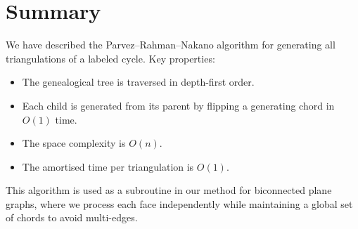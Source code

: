 \section{Summary}
\label{sec:cycle_summary}

We have described the Parvez–Rahman–Nakano algorithm for generating all triangulations of a labeled cycle. 
Key properties:
\begin{itemize}
    \item The genealogical tree is traversed in depth-first order.
    \item Each child is generated from its parent by flipping a generating chord in \(O(1)\) time.
    \item The space complexity is \(O(n)\).
    \item The amortised time per triangulation is \(O(1)\).
\end{itemize}

This algorithm is used as a subroutine in our method for biconnected plane graphs, where we process each face independently while maintaining a global set of chords to avoid multi-edges.